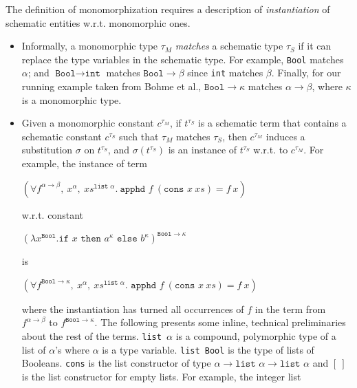 \documentclass{article}
\begin{document}
	The definition of monomorphization 
	requires a description of 
	\textit{instantiation} of schematic 
	entities w.r.t. 
	monomorphic ones.
	\begin{itemize}
		\item Informally, a monomorphic type 
		$\tau_M$ \textit{matches} a schematic 
		type $\tau_S$ if it can replace the 
		type variables in the schematic 
		type. For example, \texttt{Bool} 
		matches $\alpha$; and $\texttt{Bool} 
		\to \texttt{int}$ matches 
		$\texttt{Bool} \to \beta$
		since \texttt{int} matches 
		$\beta$. Finally, for our running 
		example taken from Bohme et al., 
		${\texttt{Bool} \to \kappa}$
		matches $\alpha \to \beta$,
		where $\kappa$ is a monomorphic
		type. 
		
		\item Given a monomorphic constant 
		$c^{\tau_M}$,  if $t^{\tau_S}$ is a 
		schematic term that contains a 
		schematic constant $c^{\tau_S}$ 
		such that $\tau_M$ matches 
		$\tau_S$, then $c^{\tau_M}$ induces 
		a substitution $\sigma$ on $t^{\tau_S}$, 
		and $\sigma(t^{\tau_S})$ is an instance of 
		$t^{\tau_S}$ w.r.t. to $c^{\tau_M}$. 
		For example, the instance of term
		\begin{center}
			$(\forall f^{\alpha \to \beta},\ 
			x^{\alpha},\ xs^{\texttt{list }
				\alpha}.\ \texttt{apphd }f\ 
			(\texttt{cons }x\ xs) = f\ x)$
		\end{center} 
		w.r.t. constant
		\begin{center}
			$(\lambda x^{\texttt{Bool}}.
			\texttt{if }x\texttt{ then }
			a^{\kappa} \texttt{ else }
			b^{\kappa})^{\texttt{Bool} \to 
				\kappa}$ 
		\end{center}
		is
		\begin{center}
			$(\forall f^{\texttt{Bool} 
				\to \kappa},\ x^{\alpha},\ 
			xs^{\texttt{list }\alpha}. 
			\texttt{ apphd }f\ (\texttt{cons }
			x \ xs) = f\ x)$
		\end{center}
		where the instantiation 
		has turned all occurrences of $f$ 
		in the term from $f^{\alpha \to \beta}$ 
		to $f^{\texttt{Bool} \to \kappa}$.
		The following presents some inline, 
		technical preliminaries about 
		the rest of the terms.
		\texttt{list $\alpha$} is a compound,
		polymorphic type of a list of 
		$\alpha$'s where $\alpha$ is a type 
		variable. \texttt{list Bool} is the 
		type of lists of Booleans. \texttt{cons} 
		is the list constructor of type 
		$\alpha \to \texttt{list }\alpha \to 
		\texttt{list }\alpha$ and $[\ ]$ is 
		the list constructor for empty lists. 
		For example, the integer list 

\end{itemize}
\end{document}
